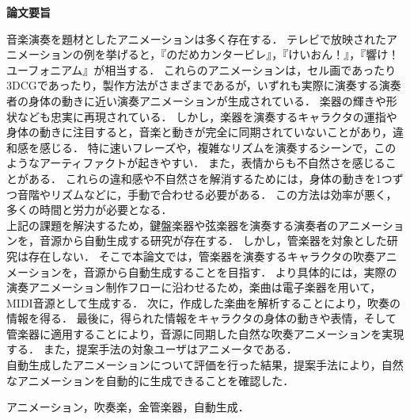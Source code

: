 \begin{center}
{\bf {\large 論文要旨}}
\end{center}

\vspace{3ex}
音楽演奏を題材としたアニメーションは多く存在する．
テレビで放映されたアニメーションの例を挙げると，『のだめカンタービレ』，『けいおん！』，『響け！ユーフォニアム』が相当する．
これらのアニメーションは，セル画であったり3DCGであったり，製作方法がさまざまであるが，いずれも実際に演奏する演奏者の身体の動きに近い演奏アニメーションが生成されている．
楽器の輝きや形状なども忠実に再現されている．
%
しかし，楽器を演奏するキャラクタの運指や身体の動きに注目すると，音楽と動きが完全に同期されていないことがあり，違和感を感じる．
特に速いフレーズや，複雑なリズムを演奏するシーンで，このようなアーティファクトが起きやすい．
また，表情からも不自然さを感じることがある．
これらの違和感や不自然さを解消するためには，身体の動きを1つずつ音階やリズムなどに，手動で合わせる必要がある．
この方法は効率が悪く，多くの時間と労力が必要となる．\\
%
\indent
上記の課題を解決するため，鍵盤楽器や弦楽器を演奏する演奏者のアニメーションを，音源から自動生成する研究が存在する．
しかし，管楽器を対象とした研究は存在しない．
そこで本論文では，管楽器を演奏するキャラクタの吹奏アニメーションを，音源から自動生成することを目指す．
より具体的には，実際の演奏アニメーション制作フローに沿わせるため，楽曲は電子楽器を用いて，MIDI音源として生成する．
次に，作成した楽曲を解析することにより，吹奏の情報を得る．
最後に，得られた情報をキャラクタの身体の動きや表情，そして管楽器に適用することにより，音源に同期した自然な吹奏アニメーションを実現する．
また，提案手法の対象ユーザはアニメータである．\\
\indent
自動生成したアニメーションについて評価を行った結果，提案手法により，自然なアニメーションを自動的に生成できることを確認した．

\vspace{4ex}

\noindent
{}

\noindent
アニメーション，吹奏楽，金管楽器，自動生成．